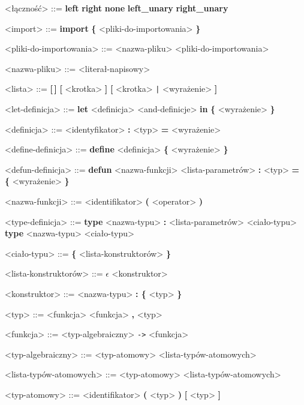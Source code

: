 \documentclass[12pt]{article}
\begin{document}
\begin{grammar}
<łączność> ::=
    \textbf{left}
    \alt \textbf{right}
    \alt \textbf{none}
    \alt \textbf{left_unary}
    \alt \textbf{right_unary}

<import> ::=
    \textbf{import} \textbf{\{} <pliki-do-importowania> \textbf{\}}

<pliki-do-importowania> ::=
    <nazwa-pliku>
     <pliki-do-importowania>

<nazwa-pliku> ::=
    <literał-napisowy>

<lista> ::=
    \textbf{[\,]}
    \alt \textbf{[} <krotka> \textbf{]}
    \alt \textbf{[} <krotka> \texttt{|} <wyrażenie> \textbf{]}

<let-definicja> ::=
    \textbf{let} <definicja> <and-definicje>
    \textbf{in} \textbf{\{} <wyrażenie> \textbf{\}} 

<definicja> ::=
    <identyfikator> \textbf{:} <typ> \textbf{=} <wyrażenie>

<define-definicja> ::=
    \textbf{define} <definicja> \textbf{\{} <wyrażenie> \textbf{\}}

<defun-definicja> ::=
    \textbf{defun} <nazwa-funkcji> <lista-parametrów> \textbf{:} <typ> 
    \textbf{= \{} <wyrażenie> \textbf{\}}

<nazwa-funkcji> ::=
    <identifikator>
    \alt \textbf{(} <operator> \textbf{)}

<type-definicja> ::=
    \textbf{type} <nazwa-typu> 
    \textbf{:} <lista-parametrów> <ciało-typu>
    \alt \textbf{type} <nazwa-typu> <ciało-typu>

<ciało-typu> ::= 
    \textbf{\{} <lista-konstruktorów> \textbf{\}}

<lista-konstruktorów> ::=
    $\epsilon$
     <konstruktor>

<konstruktor> ::=
    <nazwa-typu>
     \textbf{: \{} <typ> \textbf{\}}
    
<typ> ::=
    <funkcja>
    \alt <funkcja> \textbf{,} <typ>

<funkcja> ::= 
    <typ-algebraiczny>
     \texttt{->} <funkcja>

<typ-algebraiczny> ::=
    <typ-atomowy>
     <lista-typów-atomowych>

<lista-typów-atomowych> ::=
    <typ-atomowy>
     <lista-typów-atomowych>

<typ-atomowy> ::=
    <identifikator>
    \alt \textbf{(} <typ> \textbf{)}
    \alt \textbf{[} <typ> \textbf{]}


\end{grammar}
\end{document}
